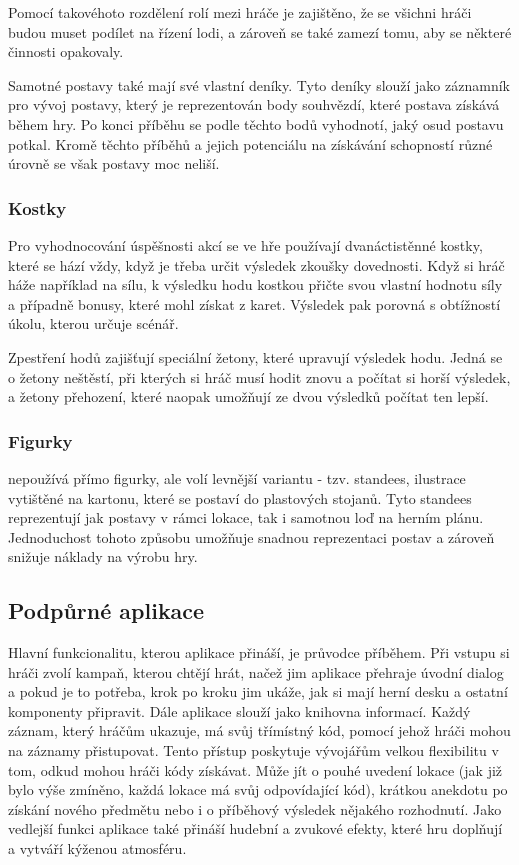 Pomocí takovéhoto rozdělení rolí mezi hráče je zajištěno, že se všichni hráči budou muset podílet na řízení lodi, a zároveň se také zamezí tomu, aby se některé činnosti opakovaly.

Samotné postavy také mají své vlastní deníky. Tyto deníky slouží jako záznamník pro vývoj postavy, který je reprezentován body souhvězdí, které postava získává během hry. Po konci příběhu se podle těchto bodů vyhodnotí, jaký osud postavu potkal. Kromě těchto příběhů a jejich potenciálu na získávání schopností různé úrovně se však postavy moc neliší.

\subsubsection*{Kostky}
\label{subsubsec:fw_comp_dice}

Pro vyhodnocování úspěšnosti akcí se ve hře používají dvanáctistěnné kostky, které se hází vždy, když je třeba určit výsledek zkoušky dovednosti. Když si hráč háže například na sílu, k výsledku hodu kostkou přičte svou vlastní hodnotu síly a případně bonusy, které mohl získat z karet. Výsledek pak porovná s obtížností úkolu, kterou určuje scénář.

Zpestření hodů zajišťují speciální žetony, které upravují výsledek hodu. Jedná se o žetony neštěstí, při kterých si hráč musí hodit znovu a počítat si horší výsledek, a žetony přehození, které naopak umožňují ze dvou výsledků počítat ten lepší. 

\subsubsection*{Figurky}
\label{subsubsec:fw_comp_figures}

 nepoužívá přímo figurky, ale volí levnější variantu - tzv. standees, ilustrace vytištěné na kartonu, které se postaví do plastových stojanů. Tyto standees reprezentují jak postavy v rámci lokace, tak i samotnou loď na herním plánu. Jednoduchost tohoto způsobu umožňuje snadnou reprezentaci postav a zároveň snižuje náklady na výrobu hry.


\subsection{Podpůrné aplikace}
\label{subsec:fw_apps}

Hlavní funkcionalitu, kterou aplikace přináší, je průvodce příběhem. Při vstupu si hráči zvolí kampaň, kterou chtějí hrát, načež jim aplikace přehraje úvodní dialog a pokud je to potřeba, krok po kroku jim ukáže, jak si mají herní desku a ostatní komponenty připravit. Dále aplikace slouží jako knihovna informací. Každý záznam, který hráčům ukazuje, má svůj třímístný kód, pomocí jehož hráči mohou na záznamy přistupovat. Tento přístup poskytuje vývojářům velkou flexibilitu v tom, odkud mohou hráči kódy získávat. Může jít o pouhé uvedení lokace (jak již bylo výše zmíněno, každá lokace má svůj odpovídající kód), krátkou anekdotu po získání nového předmětu nebo i o příběhový výsledek nějakého rozhodnutí. Jako vedlejší funkci aplikace také přináší hudební a zvukové efekty, které hru doplňují a vytváří kýženou atmosféru. \cite{fw_crossroads_app}

